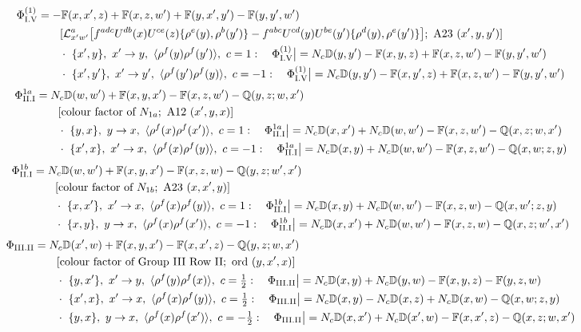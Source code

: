 \documentclass[10pt]{article}
\def\mf#1{\mathbb{#1}}
\begin{document}
\begin{align}
\Phi_{\rm I.V}^{(1)}&=-\mf{F}(x,x',z)+\mf{F}(x,z,w')+\mf{F}(y,x',y')-\mf{F}(y,y',w')\notag\\&\qquad[\mathcal{L}^{a}_{x'w'}\big[f^{adc}U^{db}(x)U^{ce}(z)\{\rho^{e}(y),\rho^{b}(y')\}-f^{abc}U^{cd}(y)U^{be}(y')\{\rho^{d}(y),\rho^{e}(y')\}\big];\ \text{A23}\ (x',y,y')]\notag\\
&\qquad\cdot\ \{x',y\},\ x'\to y,\ \langle\rho^{f}(y)\rho^{f}(y')\rangle,\ c=1:\quad \Phi_{\rm I.V}^{(1)}\big|=N_{c}\mf{D}(y,y')-\mf{F}(x,y,z)+\mf{F}(x,z,w')-\mf{F}(y,y',w')\notag\\
&\qquad\cdot\ \{x',y'\},\ x'\to y',\ \langle\rho^{f}(y')\rho^{f}(y)\rangle,\ c=-1:\quad \Phi_{\rm I.V}^{(1)}\big|=N_{c}\mf{D}(y,y')-\mf{F}(x,y',z)+\mf{F}(x,z,w')-\mf{F}(y,y',w')\notag
\end{align}
\begin{align}
\Phi_{\rm II.I}^{1a}&=N_{c}\mf{D}(w,w')+\mf{F}(x,y,x')-\mf{F}(x,z,w')-\mf{Q}(y,z;w,x')\notag\\&\qquad[\text{colour factor of }N_{1a};\ \text{A12}\ (x',y,x)]\notag\\
&\qquad\cdot\ \{y,x\},\ y\to x,\ \langle\rho^{f}(x)\rho^{f}(x')\rangle,\ c=1:\quad \Phi_{\rm II.I}^{1a}\big|=N_{c}\mf{D}(x,x')+N_{c}\mf{D}(w,w')-\mf{F}(x,z,w')-\mf{Q}(x,z;w,x')\notag\\
&\qquad\cdot\ \{x',x\},\ x'\to x,\ \langle\rho^{f}(x)\rho^{f}(y)\rangle,\ c=-1:\quad \Phi_{\rm II.I}^{1a}\big|=N_{c}\mf{D}(x,y)+N_{c}\mf{D}(w,w')-\mf{F}(x,z,w')-\mf{Q}(x,w;z,y)\notag
\end{align}
\begin{align}
\Phi_{\rm II.I}^{1b}&=N_{c}\mf{D}(w,w')+\mf{F}(x,y,x')-\mf{F}(x,z,w)-\mf{Q}(y,z;w',x')\notag\\&\qquad[\text{colour factor of }N_{1b};\ \text{A23}\ (x,x',y)]\notag\\
&\qquad\cdot\ \{x,x'\},\ x'\to x,\ \langle\rho^{f}(x)\rho^{f}(y)\rangle,\ c=1:\quad \Phi_{\rm II.I}^{1b}\big|=N_{c}\mf{D}(x,y)+N_{c}\mf{D}(w,w')-\mf{F}(x,z,w)-\mf{Q}(x,w';z,y)\notag\\
&\qquad\cdot\ \{x,y\},\ y\to x,\ \langle\rho^{f}(x)\rho^{f}(x')\rangle,\ c=-1:\quad \Phi_{\rm II.I}^{1b}\big|=N_{c}\mf{D}(x,x')+N_{c}\mf{D}(w,w')-\mf{F}(x,z,w)-\mf{Q}(x,z;w',x')\notag
\end{align}
\begin{align}
\Phi_{\rm III.II}&=N_{c}\mf{D}(x',w)+\mf{F}(x,y,x')-\mf{F}(x,x',z)-\mf{Q}(y,z;w,x')\notag\\&\qquad[\text{colour factor of Group III Row II};\ \text{ord}\ (y,x',x)]\notag\\
&\qquad\cdot\ \{y,x'\},\ x'\to y,\ \langle\rho^{f}(y)\rho^{f}(x)\rangle,\ c=\tfrac{1}{2}:\quad \Phi_{\rm III.II}\big|=N_{c}\mf{D}(x,y)+N_{c}\mf{D}(y,w)-\mf{F}(x,y,z)-\mf{F}(y,z,w)\notag\\
&\qquad\cdot\ \{x',x\},\ x'\to x,\ \langle\rho^{f}(x)\rho^{f}(y)\rangle,\ c=\tfrac{1}{2}:\quad \Phi_{\rm III.II}\big|=N_{c}\mf{D}(x,y)-N_{c}\mf{D}(x,z)+N_{c}\mf{D}(x,w)-\mf{Q}(x,w;z,y)\notag\\
&\qquad\cdot\ \{y,x\},\ y\to x,\ \langle\rho^{f}(x)\rho^{f}(x')\rangle,\ c=-\tfrac{1}{2}:\quad \Phi_{\rm III.II}\big|=N_{c}\mf{D}(x,x')+N_{c}\mf{D}(x',w)-\mf{F}(x,x',z)-\mf{Q}(x,z;w,x')\notag
\end{align}
\end{document}
